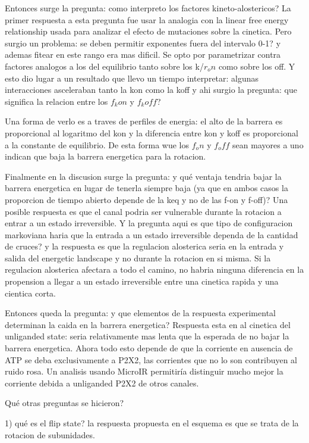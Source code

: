 \documentclass[a4paper,12pt]{article}
\begin{document}
		Entonces surge la pregunta: como interpreto los factores kineto-alostericos? La primer respuesta a esta pregunta fue usar la analogia con la linear free energy relationship usada para analizar el efecto de mutaciones sobre la cinetica. Pero surgio un problema: se deben permitir exponentes fuera del intervalo 0-1? y ademas fitear en este rango era mas dificil. Se opto por parametrizar contra factores analogos a los del equilibrio tanto sobre los k/$r_on$ como sobre los off. Y esto dio lugar a un resultado que llevo un tiempo interpretar: algunas interacciones asceleraban tanto la kon como la koff y ahi surgio la pregunta: 
		que significa la relacion entre los $f_kon$ y $f_koff$?
		
		Una forma de verlo es a traves de perfiles de energia: el alto de la barrera es proporcional al logaritmo del kon y la diferencia entre kon y koff es proporcional a la constante de equilibrio. 
		De esta forma wue  los $f_on$ y $f_off$ sean mayores a uno indican que baja la barrera energetica para la rotacion. 
		
		Finalmente en la discusion surge la pregunta: y qué ventaja tendria bajar la barrera energetica en lugar de tenerla siempre baja (ya que en ambos casos la proporcion de tiempo abierto depende de la keq y no de las f-on y f-off)? 
		Una posible respuesta es que el canal podria ser vulnerable durante la rotacion a entrar a un estado irreversible. Y la pregunta aqui es que tipo de configuracion markoviana haria que la entrada a un estado irreversible dependa de la cantidad de cruces? y la respuesta es que la regulacion alosterica seria en la entrada y salida del energetic landscape y no durante la rotacion en si misma. Si la regulacion alosterica afectara a todo el camino, no habria ninguna diferencia en la propension a llegar a un estado irreversible entre una cinetica rapida y una cientica corta. 
		
		Entonces queda la pregunta: y que elementos de la respuesta experimental determinan la caida en la barrera energetica? Respuesta esta en al cinetica del unliganded state: seria relativamente mas lenta que la esperada de no bajar la barrera energetica. 
		Ahora todo esto depende de que la corriente en ausencia de ATP se deba exclusivamente a P2X2, las corrientes que no lo son contribuyen al ruido rosa. Un analisis usando MicroIR permitiría distinguir mucho mejor la corriente debida a unliganded P2X2 de otros canales. 
		
		Qué otras preguntas se hicieron?
		
		1) qué es el flip state? la respuesta propuesta en el esquema es que se trata de la rotacion de subunidades.
		
\end{document}
